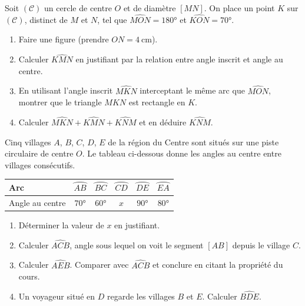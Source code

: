 \documentclass[11pt]{article}
\begin{document}
\begin{exercice}
Soit $(\mathcal{C})$ un cercle de centre $O$ et de diamètre $[MN]$. On place un point $K$ sur $(\mathcal{C})$, distinct de $M$ et $N$, tel que $\widehat{MON} = 180°$ et $\widehat{KON} = 70°$.
\begin{enumerate}
\item Faire une figure (prendre $ON = \SI{4}{\cm}$).
\item Calculer $\widehat{KMN}$ en justifiant par la relation entre angle inscrit et angle au centre.
\item En utilisant l'angle inscrit $\widehat{MKN}$ interceptant le même arc que $\widehat{MON}$, montrer que le triangle $MKN$ est rectangle en $K$.
\item Calculer $\widehat{MKN} + \widehat{KMN} + \widehat{KNM}$ et en déduire $\widehat{KNM}$.
\end{enumerate}
\end{exercice}

\begin{exercice}
Cinq villages $A$, $B$, $C$, $D$, $E$ de la région du Centre sont situés sur une piste circulaire de centre $O$. Le tableau ci-dessous donne les angles au centre entre villages consécutifs.

\begin{center}
\begin{tabular}{|l|c|c|c|c|c|}
\hline
Arc & $\wideparen{AB}$ & $\wideparen{BC}$ & $\wideparen{CD}$ & $\wideparen{DE}$ & $\wideparen{EA}$ \\
\hline
Angle au centre & $70°$ & $60°$ & $x$ & $90°$ & $80°$ \\
\hline
\end{tabular}
\end{center}

\begin{enumerate}
\item Déterminer la valeur de $x$ en justifiant.
\item Calculer $\widehat{ACB}$, angle sous lequel on voit le segment $[AB]$ depuis le village $C$.
\item Calculer $\widehat{AEB}$. Comparer avec $\widehat{ACB}$ et conclure en citant la propriété du cours.
\item Un voyageur situé en $D$ regarde les villages $B$ et $E$. Calculer $\widehat{BDE}$.
\end{enumerate}
\end{exercice}
\end{document}
